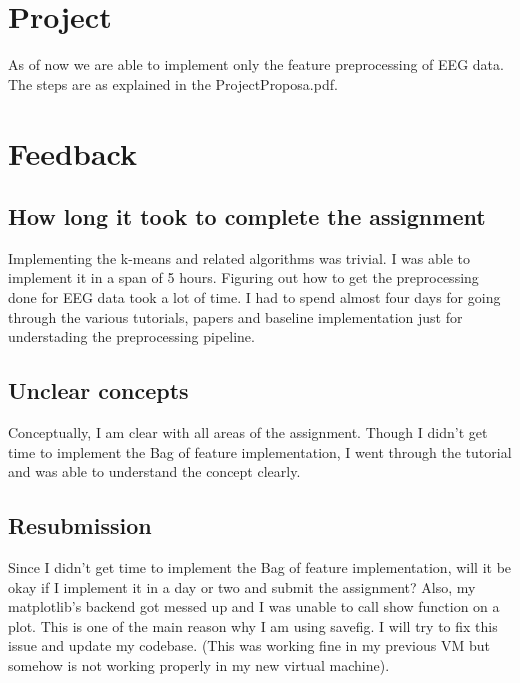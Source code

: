 \documentclass{article}
\begin{document}
       \section{Project}
       As of now we are able to implement only the feature preprocessing of EEG data.  The steps are as explained in the ProjectProposa.pdf.

       \section{Feedback}
       \subsection{How long it took to complete the assignment}
          Implementing the k-means and related algorithms was trivial.  I was able to implement it in a span of 5 hours.  Figuring out how to get the preprocessing done for EEG data took a lot of time.  I had to spend almost four days for going through the various tutorials, papers and baseline implementation just for understading the preprocessing pipeline.
       \subsection{Unclear concepts}
          Conceptually, I am clear with all areas of the assignment.   Though I didn't get time to implement the Bag of feature implementation, I went through the tutorial and was able to understand the concept clearly.
       \subsection{Resubmission}
       Since I didn't get time to implement the Bag of feature implementation, will it be okay if I implement it in a day or two and submit the assignment?  Also, my matplotlib's backend got messed up and I was unable to call show function on a plot.  This is one of the main reason why I am using savefig.  I will try to fix this issue and update my codebase.  (This was working fine in my previous VM but somehow is not working properly in my new virtual machine).
\end{document}
